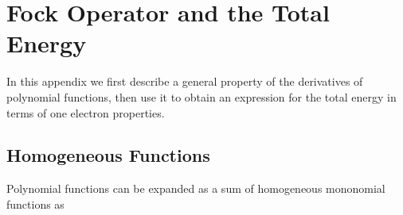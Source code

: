 \documentclass[aps,preprint]{revtex4}%
\begin{document}
\section{\bigskip Fock Operator and the Total Energy\label{Fock&Energy}}

In this appendix we first describe a general property of the derivatives of
polynomial functions, then use it to obtain an expression for the total energy
in terms of one electron properties.

\subsection{Homogeneous Functions\label{HomFunc}}

Polynomial functions can be expanded as a sum of homogeneous mononomial
functions as%
\end{document}
